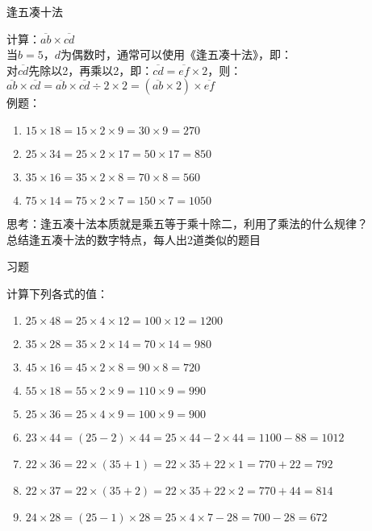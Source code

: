 \documentclass[aspectratio=169]{ctexbeamer} %
\date{\today}
\begin{document}
\begin{frame}[t]{逢五凑十法}
\begin{spacing}{1.2}
\normalsize
计算：$\overline{ab} \times \overline{cd}$ \\
当$b = 5$，$d$为偶数时，通常可以使用《逢五凑十法》，即：\\
对$\overline{cd}$先除以2，再乘以2，即：$\overline{cd} = \overline{ef} \times 2$，则：\\
$\overline{ab} \times \overline{cd} = \overline{ab} \times \overline{cd} \div 2 \times 2 = (\overline{ab} \times 2) \times \overline{ef} $ \\
例题：
\begin{enumerate}[label={\arabic*.}]
\item $15 \times 18  = 15 \times 2 \times 9=30 \times 9 = 270$
\item $25 \times 34  = 25 \times 2 \times 17=50 \times 17 = 850$
\item $35 \times 16  = 35 \times 2 \times 8=70 \times 8 = 560$
\item $75 \times 14  = 75 \times 2 \times 7=150 \times 7 = 1050$
\end{enumerate}
\alert{思考：逢五凑十法本质就是乘五等于乘十除二，利用了乘法的什么规律？} \\
\alert{总结逢五凑十法的数字特点，每人出2道类似的题目} \\
\end{spacing}
\end{frame}

\begin{frame}[t]{习题}
\begin{spacing}{1.2}
\normalsize
计算下列各式的值：
\begin{enumerate}[label={\arabic*.}]
\item $25 \times 48  = 25 \times 4 \times 12 = 100 \times 12 = 1200$
\item $35 \times 28  = 35 \times 2 \times 14 = 70 \times 14 = 980$
\item $45 \times 16  = 45 \times 2 \times 8 = 90 \times 8 = 720$
\item $55 \times 18  = 55 \times 2 \times 9 = 110 \times 9 = 990$
\item $25 \times 36  = 25 \times 4 \times 9 = 100 \times 9 = 900$
\item $23 \times 44  = (25 - 2) \times 44 = 25 \times 44 - 2 \times 44 = 1100 - 88 = 1012$
\item $22 \times 36  = 22 \times (35+1) = 22 \times 35 + 22 \times 1 = 770 + 22 = 792$
\item $22 \times 37  = 22 \times (35+2) = 22 \times 35 + 22 \times 2 = 770 + 44 = 814$
\item $24 \times 28  = (25-1) \times 28 = 25 \times 4 \times 7 - 28 = 700 - 28 = 672$
\end{enumerate}

\end{spacing}
\end{frame}
\end{document}
